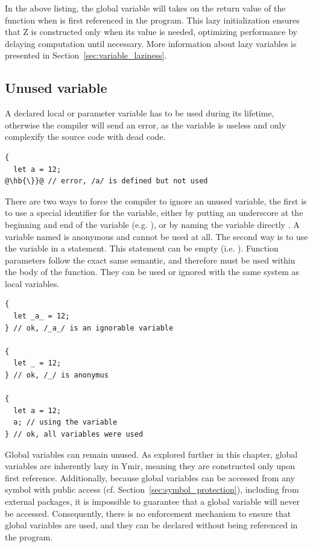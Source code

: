 In the above listing, the global variable  will takes on the return
value of the function  when  is first referenced in the
program. This lazy initialization ensures that Z is constructed only when its
value is needed, optimizing performance by delaying computation until necessary.
More information about lazy variables is presented in
Section~\ref{sec:variable_laziness}.

\subsection{Unused variable}
\label{sec:unused_variables}

A declared local or parameter variable has to be used during its lifetime,
otherwise the compiler will send an error, as the variable is useless and only
complexify the source code with dead code.

\begin{lstlisting}[style=coloredverbatimError, escapechar=@]
{
  let a = 12;
@\hb{\}}@ // error, /a/ is defined but not used
\end{lstlisting}

There are two ways to force the compiler to ignore an unused variable, the first
is to use a special identifier for the variable, either by putting an underscore
at the beginning and end of the variable (e.g. ), or by naming the
variable directly \token{\_}. A variable named \token{\_} is anonymous and
cannot be used at all. The second way is to use the variable in a statement.
This statement can be empty (i.e. ). Function parameters follow the
exact same semantic, and therefore must be used within the body of the function.
They can be used or ignored with the same system as local variables.

\begin{lstlisting}[style=coloredverbatim, escapechar=@]
{
  let _a_ = 12;
} // ok, /_a_/ is an ignorable variable

{
  let _ = 12;
} // ok, /_/ is anonymus

{
  let a = 12;
  a; // using the variable
} // ok, all variables were used
\end{lstlisting}

Global variables can remain unused. As explored further in this chapter, global
variables are inherently lazy in Ymir, meaning they are constructed only upon
first reference. Additionally, because global variables can be accessed from any
symbol with public access (cf. Section~\ref{sec:symbol_protection}), including
from external packages, it is impossible to guarantee that a global variable
will never be accessed. Consequently, there is no enforcement mechanism to
ensure that global variables are used, and they can be declared without being
referenced in the program.

